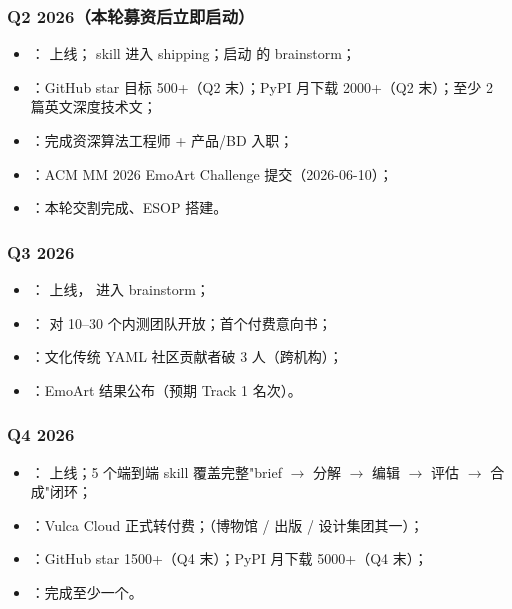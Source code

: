 \subsubsection*{Q2 2026（本轮募资后立即启动）}
\begin{itemize}
  \item {}： 上线； skill 进入 shipping；启动  的 brainstorm；
  \item {}：GitHub star 目标 500+（Q2 末）；PyPI 月下载 2000+（Q2 末）；至少 2 篇英文深度技术文；
  \item {}：完成资深算法工程师 + 产品/BD 入职；
  \item {}：ACM MM 2026 EmoArt Challenge 提交（2026-06-10）；
  \item {}：本轮交割完成、ESOP 搭建。
\end{itemize}

\subsubsection*{Q3 2026}
\begin{itemize}
  \item {}： 上线， 进入 brainstorm；
  \item {}： 对 10–30 个内测团队开放；首个付费意向书；
  \item {}：文化传统 YAML 社区贡献者破 3 人（跨机构）；
  \item {}：EmoArt 结果公布（预期 Track 1 名次）。
\end{itemize}

\subsubsection*{Q4 2026}
\begin{itemize}
  \item {}： 上线；5 个端到端 skill 覆盖完整"brief $\to$ 分解 $\to$ 编辑 $\to$ 评估 $\to$ 合成"闭环；
  \item {}：Vulca Cloud 正式转付费；（博物馆 / 出版 / 设计集团其一）；
  \item {}：GitHub star 1500+（Q4 末）；PyPI 月下载 5000+（Q4 末）；
  \item {}：完成至少一个。
\end{itemize}

